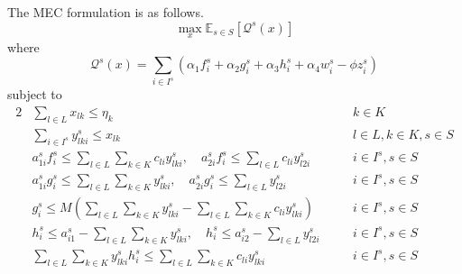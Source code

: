The MEC formulation is as follows.
\begin{equation}
    \max_{x} \mathbb{E}_{s\in S} [ \mathcal{Q}^s(x)]
    \label{eq1}
\end{equation}
where
\begin{equation}
    \mathcal{Q}^s(x) = %
    \sum_{i \in I^s}  (  \alpha_1 f_i^s + \alpha_2 g_i^s + \alpha_3 h_i^s + \alpha_4  w_i^s -\phi z_i^s ) \nonumber
\end{equation}
subject to
\begin{alignat}{2}
   & \sum_{l \in L} x_{lk} \leq \eta_k   &\quad&  k \in K
    \label{eq3}\\
   & \sum_{i\in I^s}y_{lki}^s \leq x_{lk}  &&  l \in L,   k \in K,  s \in S 
    \label{eq4}\\
     &  a_{1i}^s f_i^s \leq \sum_{l \in L} \sum_{k \in K} c_{li} y_{lki}^s, \quad a_{2i}^s f_i^s \leq \sum_{l \in L}   c_{li} y_{l2i}^s &&  i \in I^s,   s \in S \label{eq6}\\
     &   a_{1i}^s g_i^s \leq \sum_{l \in L} \sum_{k \in K} y_{lki}^s, \quad  a_{2i}^s g_i^s \leq \sum_{l \in L}   y_{l2i}^s &&   i \in I^s, s \in S \label{eq7}\\
    & g_i^s \leq M \left( \sum_{l \in L} \sum_{k \in K } y_{lki}^s - \sum_{l \in L} \sum_{k \in K} c_{li} y_{lki}^s \right) &&  i \in I^s,   s\in S   \label{eq8}\\
  & h_i^s \leq   a_{i1}^s - \sum_{l \in L} \sum_{k \in K} y_{lki}^s, \quad h_i^s \leq   a_{i2}^s - \sum_{l \in L}   y_{l2i}^s  && i \in I^s,   s\in S
    \label{eq9}\\
 & \sum_{l \in L} \sum_{k \in K} y_{lki}^s h_i^s \leq \sum_{l \in L} \sum_{k \in K} c_{li} y_{lki}^s && i \in I^s,  s\in S

\end{alignat}
